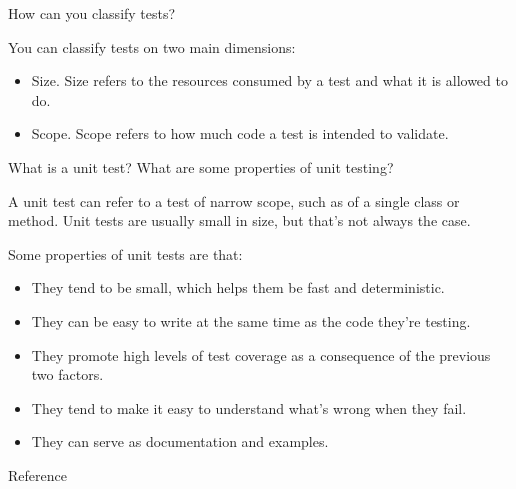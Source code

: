 \begin{questions}
\question[2] How can you classify tests?
\begin{solution}
You can classify tests on two main dimensions:
\begin{itemize}
    \item Size. Size refers to the resources consumed by a test and what it is allowed to do.
    \item Scope. Scope refers to how much code a test is intended to validate.
\end{itemize}
\end{solution}

\question[5]What is a unit test? What are some properties of unit testing?
\begin{solution}
A unit test can refer to a test of narrow scope, such as of a single class or method. Unit tests are usually small in size, but that's not always the case.

Some properties of unit tests are that:
\begin{itemize}
    \item They tend to be small, which helps them be fast and deterministic.
    \item They can be easy to write at the same time as the code they're testing.
    \item They promote high levels of test coverage as a consequence of the previous two factors.
    \item They tend to make it easy to understand what's wrong when they fail.
    \item They can serve as documentation and examples.
\end{itemize}
Reference \cite[Chapter~17]{seg}
\end{solution}
\end{questions}

